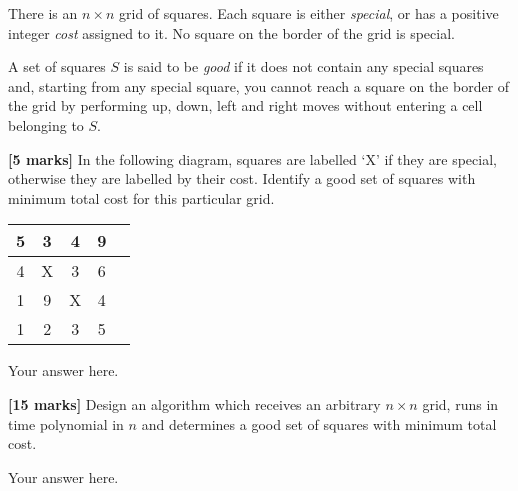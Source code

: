 \documentclass{article}
\begin{document}
\setcounter{question}{0}

\begin{Question}
There is an $n \times n$ grid of squares. Each square is either \textit{special}, or has a positive integer \textit{cost} assigned to it. No square on the border of the grid is special.

A set of squares $S$ is said to be \emph{good} if it does not contain any special squares and, starting from any special square, you cannot reach a square on the border of the grid by performing up, down, left and right moves without entering a cell belonging to $S$.

\begin{Subquestion}
\textbf{[5 marks]} In the following diagram, squares are labelled `X' if they are special, otherwise they are labelled by their cost. Identify a good set of squares with minimum total cost for this particular grid.

\begin{center}
    \begin{tabular}{|c|c|c|c|c|}
         \hline 5 & 3 & 4 & 9 \\
         \hline 4 & X & 3 & 6 \\
         \hline 1 & 9 & X & 4 \\
         \hline 1 & 2 & 3 & 5 \\
         \hline
    \end{tabular}
\end{center}

\begin{answer}
Your answer here.
\end{answer}
\end{Subquestion}

\begin{Subquestion}
\textbf{[15 marks]} Design an algorithm which receives an arbitrary $n \times n$ grid, runs in time polynomial in $n$ and determines a good set of squares with minimum total cost.

\begin{answer}
Your answer here.
\end{answer}
\end{Subquestion}
\end{Question}
\end{document}

